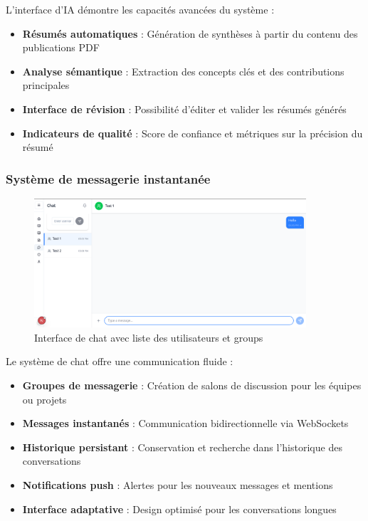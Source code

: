 \documentclass{rapportPfe}
\begin{document}
L'interface d'IA démontre les capacités avancées du système :
\begin{itemize}
    \item \textbf{Résumés automatiques} : Génération de synthèses à partir du contenu des publications PDF
    \item \textbf{Analyse sémantique} : Extraction des concepts clés et des contributions principales
    \item \textbf{Interface de révision} : Possibilité d'éditer et valider les résumés générés
    \item \textbf{Indicateurs de qualité} : Score de confiance et métriques sur la précision du résumé
\end{itemize}

\subsubsection{Système de messagerie instantanée}

\begin{figure}[H]
    \centering
    \includegraphics[width=0.9\textwidth]{diagrams/a_ss_06.png}
    \caption{Interface de chat avec liste des utilisateurs et groups}
    \label{fig:chat}
\end{figure}

Le système de chat offre une communication fluide :
\begin{itemize}
    \item \textbf{Groupes de messagerie} : Création de salons de discussion pour les équipes ou projets
    \item \textbf{Messages instantanés} : Communication bidirectionnelle via WebSockets
    \item \textbf{Historique persistant} : Conservation et recherche dans l'historique des conversations
    \item \textbf{Notifications push} : Alertes pour les nouveaux messages et mentions
    \item \textbf{Interface adaptative} : Design optimisé pour les conversations longues
\end{itemize}
\end{document}
